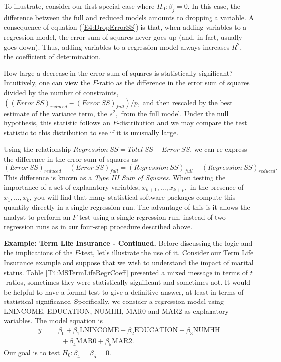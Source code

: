 To illustrate, consider our first special case where $H_0 : \beta_j
= 0$. In this case, the difference between the full and reduced
models amounts to dropping a variable. A consequence of equation
(\ref{E4:DropErrorSS}) is that, when adding variables to a
regression model, the error sum of squares never goes up (and, in
fact, usually goes down). Thus, adding variables to a regression
model always increases $R^2,$ the coefficient of determination.

How large a decrease in the error sum of squares is statistically
significant? Intuitively, one can view the $F$-ratio as the
difference in the error sum of squares divided by the number of
constraints, $((Error~SS)_{reduced}-(Error~SS)_{full})/p,$ and then
rescaled by the best estimate of the variance term, the $s^{2},$
from the full model. Under the null hypothesis, this statistic
follows an $F$-distribution and we may compare the test statistic to
this distribution to see if it is unusually large.

Using the relationship $Regression~SS=Total~SS-Error~SS$, we can
re-express the difference in the error sum of squares as
\begin{equation*}
(Error~SS)_{reduced}-(Error~SS)_{full}=(Regression~SS)_{full}-(Regression~SS)_{reduced}.
\end{equation*} 
This difference is known as a \emph{Type III Sum of Squares}. When
testing the importance of a set of explanatory variables,
$x_{k+1},\ldots,x_{k+p},$ in the presence of $x_1,\ldots,x_k$, you
will find that many statistical software packages compute this
quantity directly in a single regression run. The advantage of this
is it allows the analyst to perform an $F$-test using a single
regression run, instead of two regression runs as in our four-step
procedure described above.

\linejed

\textbf{Example: Term Life Insurance - Continued.} Before discussing
the logic and the implications of the $F$-test, let's illustrate the
use of it. Consider our Term Life Insurance example and suppose that
we wish to understand the impact of marital status. Table
\ref{T4:MSTermLifeRegrCoeff} presented a mixed message in terms of
$t$-ratios, sometimes they were statistically significant and
sometimes not. It would be helpful to have a formal test to give a
definitive answer, at least in terms of statistical significance.
Specifically, we consider a regression model using LNINCOME,
EDUCATION, NUMHH, MAR0 and MAR2 as explanatory variables. The model
equation is
\begin{eqnarray*}
y &=& \beta_0 + \beta_1 \textrm{LNINCOME} +\beta_2
\textrm{EDUCATION} + \beta_3 \textrm{NUMHH} \\
 & & ~~ +\beta_4 \textrm{MAR0} +\beta_5\textrm{MAR2}.
\end{eqnarray*}
Our goal is to test $H_0: \beta_4 = \beta_5 = 0 $.

